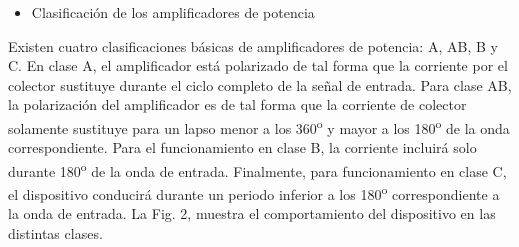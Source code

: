 \documentclass[12pt]{article}
\begin{document}
\vspace{\baselineskip}

\vspace{\baselineskip}
\begin{itemize}
	\item {\fontsize{14pt}{16.8pt}\selectfont \textcolor[HTML]{5C2D91}{Clasificación de los amplificadores de potencia}\par}
\end{itemize}\par


\vspace{\baselineskip}
\begin{adjustwidth}{0.86in}{0.88in}
\begin{justify}
Existen cuatro clasificaciones básicas de amplificadores de potencia: A, AB, B y C. En clase A, el amplificador está polarizado de tal forma que la corriente por el colector sustituye durante el ciclo completo de la señal de entrada. Para clase AB, la polarización del amplificador es de tal forma que la corriente de colector solamente sustituye para un lapso menor a los 360\textsuperscript{o} y mayor a los 180\textsuperscript{o} de la onda correspondiente. Para el funcionamiento en clase B, la corriente incluirá solo durante 180\textsuperscript{o} de la onda de entrada. Finalmente, para funcionamiento en clase C, el dispositivo conducirá durante un periodo inferior a los 180\textsuperscript{o} correspondiente a la onda de entrada. La Fig. 2, muestra el comportamiento del dispositivo en las distintas clases.
\end{justify}\par

\end{adjustwidth}


\vspace{\baselineskip}


\end{document}
